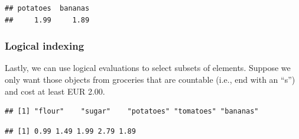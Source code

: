 \documentclass[
  11pt,
]{article}
\newenvironment{Shaded}{\begin{snugshade}}{\end{snugshade}}
\newcommand{\CommentTok}[1]{\textcolor[rgb]{0.56,0.35,0.01}{\textit{#1}}}
\newcommand{\FloatTok}[1]{\textcolor[rgb]{0.00,0.00,0.81}{#1}}
\newcommand{\FunctionTok}[1]{\textcolor[rgb]{0.00,0.00,0.00}{#1}}
\newcommand{\NormalTok}[1]{#1}
\newcommand{\OtherTok}[1]{\textcolor[rgb]{0.56,0.35,0.01}{#1}}
\newcommand{\SpecialCharTok}[1]{\textcolor[rgb]{0.00,0.00,0.00}{#1}}
\newcommand{\StringTok}[1]{\textcolor[rgb]{0.31,0.60,0.02}{#1}}
\begin{document}
\begin{verbatim}
## potatoes  bananas 
##     1.99     1.89
\end{verbatim}

\hypertarget{logical-indexing}{%
\subsubsection{Logical indexing}\label{logical-indexing}}

Lastly, we can use logical evaluations to select subsets of elements. Suppose we only want those objects from groceries that are countable (i.e., end with an ``s'') and cost at least EUR 2.00.

\begin{Shaded}
\end{Shaded}

\begin{verbatim}
## [1] "flour"    "sugar"    "potatoes" "tomatoes" "bananas"
\end{verbatim}

\begin{Shaded}
\end{Shaded}

\begin{verbatim}
## [1] 0.99 1.49 1.99 2.79 1.89
\end{verbatim}

\begin{Shaded}
\end{Shaded}
\end{document}
